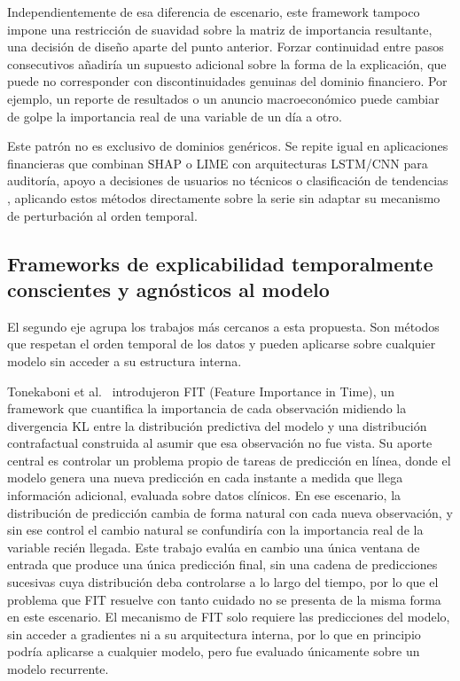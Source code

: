 \documentclass[conference, letterpaper]{IEEEtran}
\begin{document}
Independientemente de esa diferencia de escenario, este framework tampoco impone una restricción de suavidad sobre la matriz de importancia resultante, una decisión de diseño aparte del punto anterior. Forzar continuidad entre pasos consecutivos añadiría un supuesto adicional sobre la forma de la explicación, que puede no corresponder con discontinuidades genuinas del dominio financiero. Por ejemplo, un reporte de resultados o un anuncio macroeconómico puede cambiar de golpe la importancia real de una variable de un día a otro.


Este patrón no es exclusivo de dominios genéricos. Se repite igual en aplicaciones financieras que combinan SHAP o LIME con arquitecturas LSTM/CNN para auditoría, apoyo a decisiones de usuarios no técnicos o clasificación de tendencias \cite{gupta2025, sathyampeth2025, manikrao2026, jagannathan2025, kumar2024, singh2025, muhammad2024}, aplicando estos métodos directamente sobre la serie sin adaptar su mecanismo de perturbación al orden temporal.

\subsection{Frameworks de explicabilidad temporalmente conscientes y agnósticos al modelo}

El segundo eje agrupa los trabajos más cercanos a esta propuesta. Son métodos que respetan el orden temporal de los datos y pueden aplicarse sobre cualquier modelo sin acceder a su estructura interna.


Tonekaboni et al.~\cite{tonekaboni2020} introdujeron FIT (Feature Importance in Time), un framework que cuantifica la importancia de cada observación midiendo la divergencia KL entre la distribución predictiva del modelo y una distribución contrafactual construida al asumir que esa observación no fue vista. Su aporte central es controlar un problema propio de tareas de predicción en línea, donde el modelo genera una nueva predicción en cada instante a medida que llega información adicional, evaluada sobre datos clínicos. En ese escenario, la distribución de predicción cambia de forma natural con cada nueva observación, y sin ese control el cambio natural se confundiría con la importancia real de la variable recién llegada. Este trabajo evalúa en cambio una única ventana de entrada que produce una única predicción final, sin una cadena de predicciones sucesivas cuya distribución deba controlarse a lo largo del tiempo, por lo que el problema que FIT resuelve con tanto cuidado no se presenta de la misma forma en este escenario. El mecanismo de FIT solo requiere las predicciones del modelo, sin acceder a gradientes ni a su arquitectura interna, por lo que en principio podría aplicarse a cualquier modelo, pero fue evaluado únicamente sobre un modelo recurrente.
\end{document}
